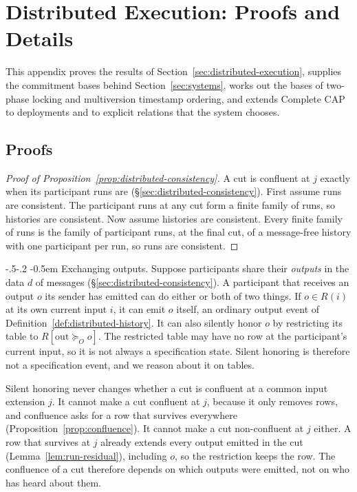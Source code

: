 \documentclass[sigconf]{cidr-2027}
\makeatletter
\theoremstyle{remark}
\renewcommand\paragraph{\@startsection{paragraph}{4}{\z@}%
  {-.5\baselineskip \@plus -2\p@ \@minus -.2\p@}%
  {-0.5em}%
  {\normalfont\bfseries}}
\newcommand{\OutputGe}{\succeq_O}
\newcommand{\commitment}{commitment\xspace}
\newcommand{\indesc}{input extension\xspace} %
\newcommand{\outrel}{extends\xspace}          %
\makeatother
\begin{document}
\section{Distributed Execution: Proofs and Details}
\label{app:proofs-sec4}

This appendix proves the results of Section~\ref{sec:distributed-execution}, supplies the
\commitment bases behind Section~\ref{sec:systems}, works out the bases of two-phase
locking and multiversion timestamp ordering, and extends Complete CAP to deployments and
to explicit relations that the system chooses.

\subsection{Proofs}

\begin{proof}[Proof of Proposition~\ref{prop:distributed-consistency}]
A cut is confluent at $j$ exactly when its participant runs are
(\S\ref{sec:distributed-consistency}). \textcolor{reviewed}{First assume runs are consistent.} The
participant runs at any cut form a finite family of runs, so histories are
consistent. Now assume histories are consistent. Every finite family of runs
is the family of participant runs, at the final cut, of a message-free history
with one participant per run, so runs are consistent.
\end{proof}

\paragraph{Exchanging outputs.}
\label{app:exchanging-outputs}
Suppose participants share their \emph{outputs} in the data $d$ of messages
(\S\ref{sec:distributed-consistency}). A participant that receives an
output $o$ its sender has emitted can do either or both of two things. If
$o\in R(i)$ at its own current input $i$, it can emit $o$ itself, an ordinary
output event of Definition~\ref{def:distributed-history}. It can also
silently honor $o$ by restricting its table to $R[\mathrm{out}\OutputGe o]$. The restricted table may have no row at the participant's current input, so it
is not always a specification state. Silent honoring is therefore not a
specification event, and we reason about it on tables.

Silent honoring never changes whether a cut is confluent at a common \indesc
$j$. It cannot make a cut confluent at $j$, because it only removes rows, and
confluence asks for a row that survives everywhere
(Proposition~\ref{prop:confluence}). It cannot make a cut non-confluent at
$j$ either. A row that survives at $j$ already
\outrel every output emitted in the cut (Lemma~\ref{lem:run-residual}),
including $o$, so the restriction keeps the row. The confluence of a cut
therefore depends on which outputs were emitted, not on who has heard about
them.
\end{document}
